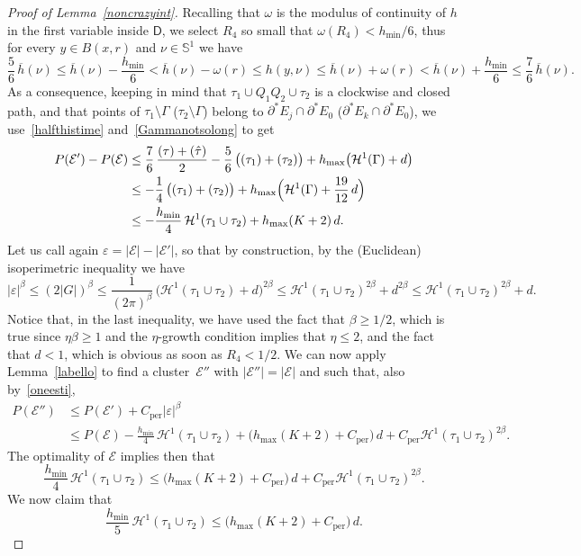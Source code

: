 \documentclass[10pt]{amsart}
\newcommand{\NoChangel}[1]{%
\expandafter\let\csname old\string#1\endcsname=#1
\let#1=\relax
\newcommand{#1}{\mathcode`l="716C\csname old\string#1\endcsname\mathcode`l="7160 }%
}
\renewcommand\S{\mathbb{S}}
\newcommand\Ceeb{C_\mathrm{per}}
\newcommand\len{\mathrm{len}}\NoChangel{\len}
\let\eps\varepsilon
\newcommand\E{\mathcal{E}}
\renewcommand\H{\mathcal{H}}
\theoremstyle{plain}
\theoremstyle{definition}
\begin{document}
\begin{proof}[Proof of Lemma~\ref{noncrazyint}]
Recalling that $\omega$ is the modulus of continuity of $h$ in the first variable inside $\mathsf{D}$, we select $R_4$ so small that $\omega(R_4)< h_{\min}/6$, thus for every $y\in B(x,r)$ and $\nu\in\S^1$ we have
\[
\frac 56\, \overline h(\nu) \leq \overline h(\nu)- \frac{h_{\min}}6<\overline h(\nu)- \omega(r) \leq h(y,\nu) \leq \overline h(\nu) + \omega(r)< \overline h(\nu) + \frac{h_{\min}}6 \leq \frac 76\,\overline h(\nu).
\]
As a consequence, keeping in mind that $\tau_1\cup Q_1Q_2\cup\tau_2$ is a clockwise and closed path, and that points of $\tau_1\setminus \Gamma$ (\resp $\tau_2\setminus\Gamma$) belong to $\partial^* E_j\cap\partial^* E_0$ (\resp $\partial^* E_k\cap \partial^* E_0$), we use~\eqref{halfthistime} and~\eqref{Gammanotsolong} to get
\begin{align}
P(\E')-P(\E)&\leq \frac 76\,\frac{\len(\tau)+\len(\hat\tau)}2 - \frac 56\, \big(\len(\tau_1) +\len(\tau_2)\big)+ h_{\max} \big(\H^1(\Gamma)+d\big)\notag\\
&\leq -\frac 14\, \big(\len(\tau_1) +\len(\tau_2)\big)+ h_{\max} \Bigl(\H^1(\Gamma)+\frac{19}{12}\,d\Bigr)\label{oneesti}\\
& \leq -\frac {h_{\min}}4\, \H^1(\tau_1\cup\tau_2) + h_{\max} (K+2)\,d.\notag
\end{align}
Let us call again $\eps=|\E|-|\E'|$, so that by construction, by the (Euclidean) isoperimetric inequality we have
\[
|\eps|^\beta \leq (2 |G|)^\beta \leq \frac 1{(2\pi)^\beta} \, \big(\H^1(\tau_1 \cup\tau_2)+d\big)^{2\beta}\leq
\H^1(\tau_1 \cup\tau_2)^{2\beta}+d^{2\beta}
\leq \H^1(\tau_1 \cup\tau_2)^{2\beta}+d.
\]
Notice that, in the last inequality, we have used the fact that $\beta\geq 1/2$, which is true since $\eta\beta\geq 1$ and the $\eta$-growth condition implies that $\eta\leq 2$, and the fact that $d<1$, which is obvious as soon as $R_4<1/2$. We can now apply Lemma~\ref{labello} to find a cluster~$\E''$ with $|\E''|=|\E|$ and such that, also by~\eqref{oneesti},
\[\begin{split}
P(\E'') &\leq P(\E') + \Ceeb |\eps|^\beta\\
&\leq P(\E) -\frac{h_{\min}}4\,\H^1(\tau_1 \cup\tau_2)+ \Big(h_{\max} (K+2)+ \Ceeb\Big)\,d + \Ceeb \H^1(\tau_1 \cup\tau_2)^{2\beta}.
\end{split}\]
The optimality of $\E$ implies then that
\[
\frac{h_{\min}}4\,\H^1(\tau_1 \cup\tau_2)\leq \Big(h_{\max} (K+2)+ \Ceeb\Big)\,d + \Ceeb \H^1(\tau_1 \cup\tau_2)^{2\beta}.
\]
We now claim that
\begin{equation}\label{sinceopt}
\frac{h_{\min}}5\,\H^1(\tau_1 \cup\tau_2)\leq \Big(h_{\max} (K+2)+ \Ceeb\Big)\,d.

\end{equation}
\end{proof}
\end{document}
